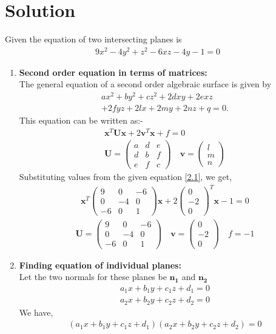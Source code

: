 \documentclass[journal,12pt,twocolumn]{IEEEtran}
\let\vec\mathbf
\numberwithin{equation}{subsection}
\newcommand{\myvec}[1]{\ensuremath{\begin{pmatrix}#1\end{pmatrix}}}
\begin{document}
\section{Solution}
Given the equation of two intersecting planes is 
\begin{align}
   9x^2 -4y^2 +z^2 -6xz -4y -1 =0\label{2.1}
\end{align}
\begin{enumerate}
\item \textbf{Second order equation in terms of matrices:}\\
The general equation of a second order algebraic surface is given by
\begin{multline}
ax^2 + by^2 + cz^2 + 2dxy + 2exz \\+ 2fyz + 2lx + 2my + 2nz + q = 0.
\end{multline}
This equation can be written as:-
\begin{align}
\vec{x}^T\vec{U}\vec{x} +2 \vec{v}^T\vec{x}+f=0\\
\vec{U} = \myvec{a&d&e\\d&b&f\\e&f&c}\quad
\vec{v}= \myvec{l\\m\\n}
\end{align}
Substituting values from the given equation \eqref{2.1}, we get,
\begin{align}
\vec{x}^T\myvec{9&0&-6\\0&-4&0\\-6&0&1}\vec{x} + 2\myvec{0\\-2\\0}^T\vec{x}-1=0
\end{align}
\begin{align}
\vec{U} = \myvec{9&0&-6\\0&-4&0\\-6&0&1} \quad
\vec{v}= \myvec{0\\-2\\0} \quad f=-1
\end{align}
\item \textbf{Finding equation of individual planes:}\\
Let the two normals for these planes be $\vec{n_1}$ and $\vec{n_2}$
\begin{align}
   a_{1}x+ b_{1}y +c_{1}z +d_{1} =0\label{2.2}\\
  a_{2}x +b_{2}y +c_{2}z +d_{2} =0\label{2.3}
\end{align}
We have,
\begin{align}
   (  a_{1}x+ b_{1}y +c_{1}z +d_{1})( a_{2}x +b_{2}y +c_{2}z +d_{2} ) = 0 \label{2.5}

\end{align}
\end{enumerate}
\end{document}
